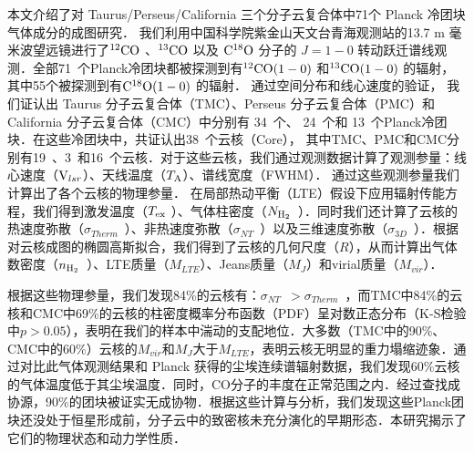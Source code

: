 \documentclass[UTF8, nocolorlinks]{pkuthss}
\newcommand{\coa}{$\rm ^{12}CO$ }
\newcommand{\cob}{$\rm ^{13}CO$ }
\newcommand{\coc}{$\rm C^{18}O$ }
\newcommand{\coaa}{$\rm^{12}CO(1-0)$ }
\newcommand{\cobb}{$\rm^{13}CO(1-0)$ }
\newcommand{\cocc}{$\rm C^{18}O(1-0)$ }
\newcommand{\vlsr}{${\rm V } _{lsr}$}
\newcommand{\ta}{$T_{\rm A}$}
\newcommand{\texc}{$T_{\rm {ex}}$ }
\newcommand{\nhyd}{$N_{\rm H_2}$\ }
\newcommand{\nnhyd}{$n_{\rm H_2}$\ }
\newcommand{\sigmath}{$\sigma _{Therm}$\ }
\newcommand{\sigmant}{$\sigma _{NT}$\ }
\newcommand{\sigmatd}{$\sigma _{3D}$\ }
\newcommand{\numsou}{71\ }
\newcommand{\numsoutmc}{34\ }
\newcommand{\numsoupmc}{13\ }
\newcommand{\numsoucmc}{24\ }
\newcommand{\numcore}{38\ }
\newcommand{\numcoretmc}{19\ }
\newcommand{\numcorepmc}{3\ }
\newcommand{\numcorecmc}{16\ }
\begin{document}
	\frontmatter
	\maketitle

\begin{cabstract}

	本文介绍了对 Taurus/Perseus/California 三个分子云复合体中71个 Planck 冷团块气体成分的成图研究． 我们利用中国科学院紫金山天文台青海观测站的13.7 m 毫米波望远镜进行了\coa、\cob 以及 \coc 分子的 $J=1-0$ 转动跃迁谱线观测．全部\numsou 个Planck冷团块都被探测到有\coaa 和\cobb 的辐射，其中55个被探测到有\cocc 的辐射． 通过空间分布和线心速度的验证， 我们证认出 Taurus 分子云复合体（TMC）、Perseus 分子云复合体（PMC）和 California 分子云复合体（CMC）中分别有 \numsoutmc 个、 \numsoucmc 个和 \numsoupmc 个Planck冷团块．在这些冷团块中，共证认出\numcore 个云核（Core）， 其中TMC、PMC和CMC分别有\numcoretmc、\numcorepmc 和\numcorecmc 个云核．对于这些云核，我们通过观测数据计算了观测参量：线心速度（\vlsr ）、天线温度（\ta ）、谱线宽度（FWHM）． 通过这些观测参量我们计算出了各个云核的物理参量． 在局部热动平衡（LTE）假设下应用辐射传能方程，我们得到激发温度（\texc ）、气体柱密度（\nhyd ）．同时我们还计算了云核的热速度弥散（\sigmath ）、非热速度弥散（\sigmant ）以及三维速度弥散（\sigmatd ）．根据对云核成图的椭圆高斯拟合，我们得到了云核的几何尺度（$R$），从而计算出气体数密度（\nnhyd ）、LTE质量（$M_{LTE}$）、Jeans质量（$M_{J}$）和virial质量（$M_{vir}$）．

	根据这些物理参量，我们发现84\%的云核有：\sigmant $>$\sigmath ，而TMC中84\%的云核和CMC中69\%的云核的柱密度概率分布函数（PDF）呈对数正态分布（K-S检验中$p>0.05$），表明在我们的样本中湍动的支配地位．大多数（TMC中的90\%、CMC中的60\%）云核的$M_{vir}$和$M_{J}$大于$M_{LTE}$，表明云核无明显的重力塌缩迹象．通过对比此气体观测结果和 Planck 获得的尘埃连续谱辐射数据，我们发现60\%云核的气体温度低于其尘埃温度．同时，CO分子的丰度在正常范围之内．经过查找成协源，90\%的团块被证实无成协物．根据这些计算与分析，我们发现这些Planck团块还没处于恒星形成前，分子云中的致密核未充分演化的早期形态．本研究揭示了它们的物理状态和动力学性质．
\end{cabstract}
\end{document}

